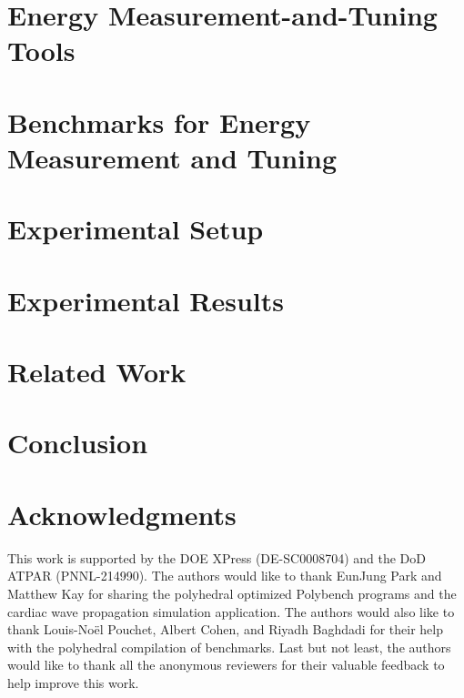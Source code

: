 \documentclass{sig-alternate}
\begin{document}
\section{Energy Measurement-and-Tuning Tools}
\label{sec:tools}


\section{Benchmarks for Energy Measurement and Tuning}
\label{sec:benchmarks}


\section{Experimental Setup}
\label{sec:setup}


\section{Experimental Results}
\label{sec:results}


\section{Related Work}
\label{sec:related}


\section {Conclusion}
\label{sec:conclusion}



\section{Acknowledgments}
This work is supported by the DOE XPress (DE-SC0008704) and the DoD ATPAR (PNNL-214990).
The authors would like to thank EunJung Park and Matthew Kay for sharing the polyhedral optimized 
Polybench programs and the cardiac wave propagation simulation application. The 
authors would also like to thank Louis-No{\"e}l Pouchet,
Albert Cohen, and Riyadh Baghdadi for their help with the polyhedral compilation 
of benchmarks. Last but not least, the authors would like to thank all the anonymous 
reviewers for their valuable feedback to help improve this work.

%
%
%
%
\end{document}
